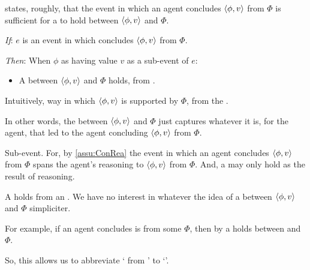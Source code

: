 \begin{note}
  \supportI{} states, roughly, that the event in which an agent concludes \(\langle \phi, v \rangle\) from \(\Phi\) is sufficient for a \ros{} to hold between \(\langle \phi, v \rangle\) and \(\Phi\).%

  \begin{idea}[\supportI{}]
    \label{idea:support}
    \vspace{-\baselineskip}
    \begin{itenum}
    \item[\emph{If}:]
      \(e\) is an event in which \vAgent{} concludes \(\langle \phi, v \rangle\) from \(\Phi\).
    \item[\emph{Then}:]
      When \vAgent{}  \(\phi\) as having value \(v\) as a sub-event of \(e\):
      \begin{itemize}
      \item
        A \emph{\ros{}} between \(\langle \phi, v \rangle\) and \(\Phi\) holds, from .
      \end{itemize}
    \end{itenum}
    \vspace{-\baselineskip}
  \end{idea}

  Intuitively, way in which \(\langle \phi, v \rangle\) is supported by \(\Phi\), from the \agpe{}.

  In other words, the \ros{} between \(\langle \phi, v \rangle\) and \(\Phi\) just captures whatever it is, for the agent, that led to the agent concluding \(\langle \phi, v \rangle\) from \(\Phi\).
\end{note}

\begin{note}
  Sub-event.
  For, by \autoref{assu:ConRea} the event in which an agent concludes \(\langle \phi, v \rangle\) from \(\Phi\) spans the agent's reasoning to \(\langle \phi, v \rangle\) from \(\Phi\).
  And, a \ros{} may only hold as the result of reasoning.
\end{note}

\begin{note}
  A \ros{} holds from an \agpe{}.
  We have no interest in whatever the idea of a \ros{} between \(\langle \phi, v \rangle\) and \(\Phi\) simpliciter.

  For example, if an agent concludes  is  from some \pool{} \(\Phi\), then by \supportI{} a \ros{} holds between  and \(\Phi\).

  {
    \color{red}
    So, this allows us to abbreviate `\ros{} from \agpe{}' to `\ros{}'.
  }
\end{note}

